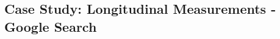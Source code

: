 \subsection{Case Study: Longitudinal Measurements - Google Search }
\label{sec:case-study-google}



